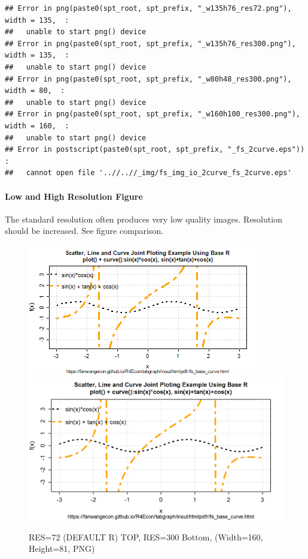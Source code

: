 \documentclass[
]{book}
\begin{document}
\begin{verbatim}
## Error in png(paste0(spt_root, spt_prefix, "_w135h76_res72.png"), width = 135,  : 
##   unable to start png() device
## Error in png(paste0(spt_root, spt_prefix, "_w135h76_res300.png"), width = 135,  : 
##   unable to start png() device
## Error in png(paste0(spt_root, spt_prefix, "_w80h48_res300.png"), width = 80,  : 
##   unable to start png() device
## Error in png(paste0(spt_root, spt_prefix, "_w160h100_res300.png"), width = 160,  : 
##   unable to start png() device
## Error in postscript(paste0(spt_root, spt_prefix, "_fs_2curve.eps")) : 
##   cannot open file '..//..//_img/fs_img_io_2curve_fs_2curve.eps'
\end{verbatim}

\hypertarget{low-and-high-resolution-figure}{%
\paragraph{Low and High Resolution Figure}\label{low-and-high-resolution-figure}}

The standard resolution often produces very low quality images. Resolution should be increased. See figure comparison.

\begin{figure}
\centering
\caption{RES=72 (DEFAULT R) TOP, RES=300 Bottom, (Width=160, Height=81, PNG)}
\includegraphics[width=\linewidth]{_img/fs_img_io_2curve_w135h76_res72.png}
\hfill
\centering
\includegraphics[width=\linewidth]{_img/fs_img_io_2curve_w135h76_res300.png}
\end{figure}
\end{document}
